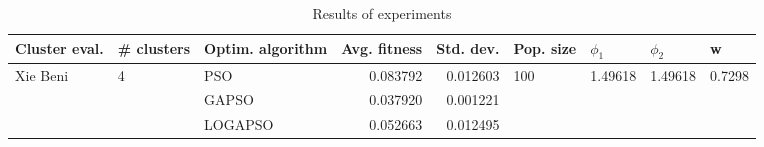 \begin{table}
\centering
\caption{Results of experiments}
\begin{tabular}{lllrrllll}
\toprule
            Cluster eval. &        \# clusters & Optim. algorithm &  Avg. fitness &  Std. dev. &            Pop. size &               $\phi_{1}$ &               $\phi_{2}$ &                       w \\
\midrule
\multirow{3}{*}{Xie Beni} & \multirow{3}{*}{4} &              PSO &      0.083792 &   0.012603 & \multirow{3}{*}{100} & \multirow{3}{*}{1.49618} & \multirow{3}{*}{1.49618} & \multirow{3}{*}{0.7298} \\
                          &                    &            GAPSO &      0.037920 &   0.001221 &                      &                          &                          &                         \\
                          &                    &          LOGAPSO &      0.052663 &   0.012495 &                      &                          &                          &                         \\
\bottomrule
\end{tabular}
\end{table}
